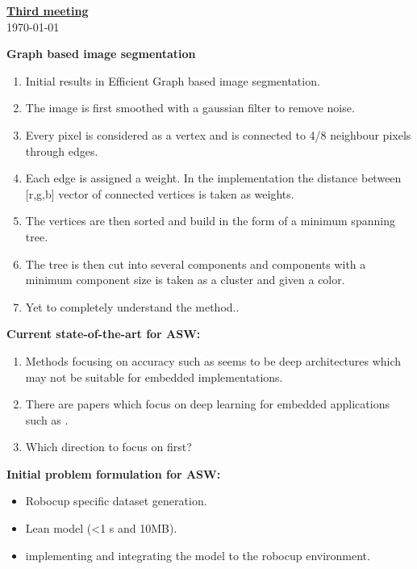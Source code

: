 \documentclass[14pt]{extarticle}
\begin{document}
\begin{center}
\begin{Large}

\underline{\textbf{Third meeting}}\\
\vspace{3mm}
\today

\end{Large}
\end{center}

\textbf{Graph based image segmentation}

\begin{enumerate}
	\item Initial results in Efficient Graph based image segmentation.
	\item The image is first smoothed with a gaussian filter to remove noise.
	\item Every pixel is considered as a vertex and is connected to 4/8 neighbour pixels through edges.
	\item Each edge is assigned a weight. In the implementation the distance between [r,g,b] vector of connected vertices is taken as weights.
	\item The vertices are then sorted and build in the form of a minimum spanning tree.
	\item The tree is then cut into several components and components with a minimum component size is taken as a cluster and given a color.
	\item Yet to completely understand the method..

\end{enumerate}

\textbf{Current state-of-the-art for ASW:}
\begin{enumerate}
	\item Methods focusing on accuracy such as \cite{1} seems to be deep architectures which may not be suitable for embedded implementations.
	\item There are papers which focus on deep learning for embedded applications such as \cite{2}\cite{3}.
	\item Which direction to focus on first?
\end{enumerate}

\textbf{Initial problem formulation for ASW:}
\begin{itemize}
	\item Robocup specific dataset generation.
	\item Lean model (<1 s and 10MB).
	\item implementing and integrating the model to the robocup environment.
	
\end{itemize}
\end{document}
